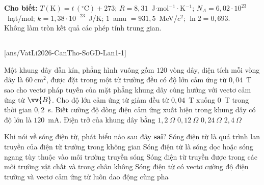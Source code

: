 \def\CheDo{solcolor}%
\def\tenchuong{Sở GD\&ĐT Cần Thơ -- Lần 1}
\def\thuonghieu{VẬT LÍ 12 -- Eduzy.com.vn}
\def\TachCauDS{1}
\def\TachCauLG{1}




	\noindent\textbf{Cho biết:} $T(\text{K})=t\,(^\circ\text{C})+273$; $R=8{,}31$~J$\cdot$mol$^{-1}\cdot$K$^{-1}$; $N_A=6{,}02\cdot 10^{23}$~hạt/mol; $k=1{,}38\cdot 10^{-23}$~J/K; $1$~amu $=931{,}5$~MeV/$c^2$; $\ln 2=0{,}693$.\\
	Không làm tròn kết quả các phép tính trung gian.

	\noindent
	\subsection*{}
	\setcounter{ex}{0}
	[ans/VatLi2026-CanTho-SoGD-Lan1-1]

	\begin{ex}%
		Một khung dây dẫn kín, phẳng hình vuông gồm $120$ vòng dây, diện tích mỗi vòng dây là $60~\text{cm}^2$, được đặt trong một từ trường đều có độ lớn cảm ứng từ $0{,}04$~T sao cho vectơ pháp tuyến của mặt phẳng khung dây cùng hướng với vectơ cảm ứng từ $\vv{B}$. Cho độ lớn cảm ứng từ giảm đều từ $0{,}04$~T xuống $0$~T trong thời gian $0{,}2$~s. Biết cường độ dòng điện cảm ứng xuất hiện trong khung dây có độ lớn là $120$~mA. Điện trở của khung dây bằng
		\choice
		{\True $1{,}2~\Omega$}
		{$0{,}12~\Omega$}
		{$0{,}24~\Omega$}
		{$2{,}4~\Omega$}
	\end{ex}

	\begin{ex}%
		Khi nói về sóng điện từ, phát biểu nào sau đây \textbf{sai}?
		\choice
		{Sóng điện từ là quá trình lan truyền của điện từ trường trong không gian}
		{\True Sóng điện từ là sóng dọc hoặc sóng ngang tùy thuộc vào môi trường truyền sóng}
		{Sóng điện từ truyền được trong các môi trường vật chất và trong chân không}
		{Sóng điện từ có vectơ cường độ điện trường và vectơ cảm ứng từ luôn dao động cùng pha}
	\end{ex}

